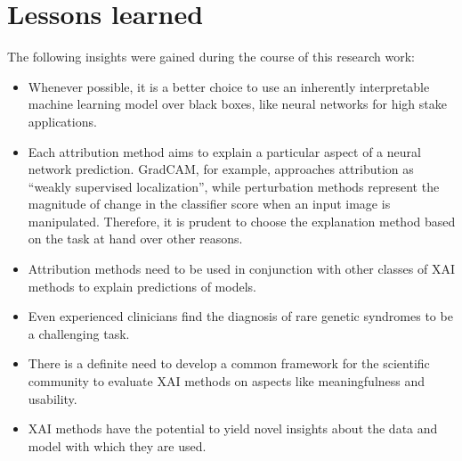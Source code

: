 \documentclass[../report.tex]{subfiles}
\begin{document}
	\section{Lessons learned}
	The following insights were gained during the course of this research work:
	\begin{itemize}
	\item Whenever possible, it is a better choice to use an inherently interpretable machine learning model over black boxes, like neural networks for high stake applications.
	\item Each attribution method aims to explain a particular aspect of a neural network prediction. GradCAM, for example, approaches attribution as \enquote{weakly supervised localization}, while perturbation methods represent the magnitude of change in the classifier score when an input image is manipulated. Therefore, it is prudent to choose the explanation method based on the task at hand over other reasons.
	\item Attribution methods need to be used in conjunction with other classes of XAI methods to explain predictions of models. 
	\item Even experienced clinicians find the diagnosis of rare genetic syndromes to be a challenging task.
	
	\item There is a definite need to develop a common framework for the scientific community to evaluate XAI methods on aspects like meaningfulness and usability.
	
	\item XAI methods have the potential to yield novel insights about the data and model with which they are used.
	\end{itemize}
\end{document}
